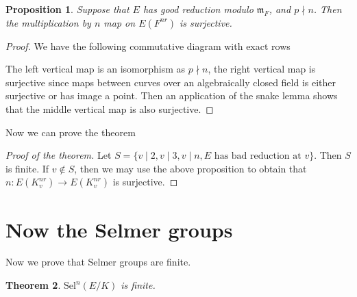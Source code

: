 \documentclass{article}
\newtheorem{thm}{Theorem}
\newtheorem{prop}[thm]{Proposition}
\begin{document}
\begin{prop}
Suppose that $ E $ has good reduction modulo $ \mathfrak{m}_{F} $,
and $ p\nmid n $.
Then the multiplication by $ n $ map on $ E (F ^{nr}) $ is surjective.
\end{prop}

\begin{proof}
We have the following commutative diagram with exact rows
\begin{figure}[H]
\centering
{}
\end{figure}
The left vertical map is an isomorphism as $ p\nmid n $,
the right vertical map is surjective since maps between curves over an algebraically closed
field is either surjective or has image a point.
Then an application of the snake lemma shows that the middle vertical map is also surjective.
\end{proof}

Now we can prove the theorem
\begin{proof}
[Proof of the theorem]
Let $ S = \{v\mid 2, v\mid 3, v\mid n, E \text{ has bad reduction at } v\} $.
Then $ S $ is finite.
If $ v\not\in S $, then we may use the above proposition to obtain that
$ n: E (K _{v}^{nr})\to E (K _{v}^{nr}) $ is surjective.
\end{proof}

\section{Now the Selmer groups}

Now we prove that Selmer groups are finite.

\begin{thm}
$ \mathrm{Sel}^{n}(E/K) $ is finite.
\end{thm}
\end{document}
